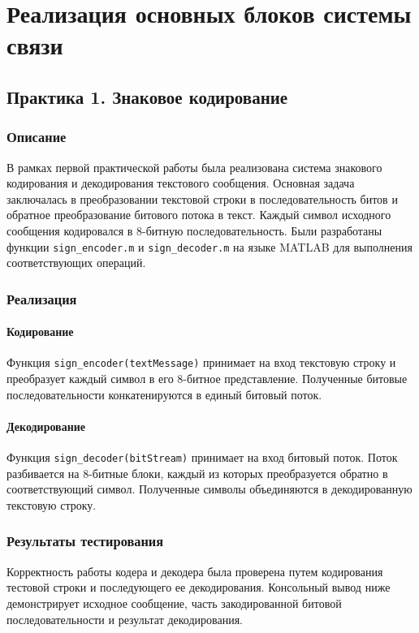 \chapter{Реализация основных блоков системы связи}

\section{Практика 1. Знаковое кодирование}

\subsection{Описание}
В рамках первой практической работы была реализована система знакового кодирования и декодирования текстового сообщения. Основная задача заключалась в преобразовании текстовой строки в последовательность битов и обратное преобразование битового потока в текст. Каждый символ исходного сообщения кодировался в 8-битную последовательность. Были разработаны функции \texttt{sign\_encoder.m} и \texttt{sign\_decoder.m} на языке MATLAB для выполнения соответствующих операций.

\subsection{Реализация}
\subsubsection{Кодирование}
Функция \texttt{sign\_encoder(textMessage)} принимает на вход текстовую строку и преобразует каждый символ в его 8-битное представление. Полученные битовые последовательности конкатенируются в единый битовый поток.

\subsubsection{Декодирование}
Функция \texttt{sign\_decoder(bitStream)} принимает на вход битовый поток. Поток разбивается на 8-битные блоки, каждый из которых преобразуется обратно в соответствующий символ. Полученные символы объединяются в декодированную текстовую строку.

\subsection{Результаты тестирования}
Корректность работы кодера и декодера была проверена путем кодирования тестовой строки и последующего ее декодирования. Консольный вывод ниже демонстрирует исходное сообщение, часть закодированной битовой последовательности и результат декодирования.

